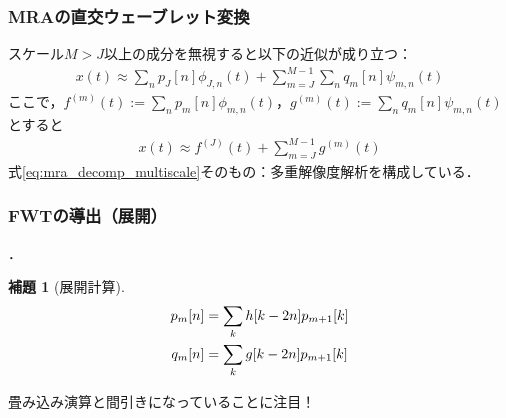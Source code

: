 \documentclass[dvipdfmx,graphicx,14pt]{beamer}
\newcommand{\roverline}[1]{\mathpalette\doroverline{#1}}
\newcommand{\doroverline}[2]{\overline{#1#2}}
\newtheorem{mylemma}{補題}
\begin{document}
\begin{frame}[c]
    \frametitle{MRAの直交ウェーブレット変換}
    スケール$M > J$以上の成分を無視すると以下の近似が成り立つ：
    \begin{align}
        x(t) \approx \sum_{n} p_{J}[n] \phi_{J,n}(t) + \sum_{m=J}^{M-1}\sum_{n} q_{m}[n] \psi_{m,n}(t) \label{eq:orth_approx}
    \end{align}
    ここで，$f^{(m)}(t) := \sum_{n} p_{m}[n] \phi_{m,n}(t)$，$g^{(m)}(t) := \sum_{n} q_{m}[n] \psi_{m,n}(t)$とすると
    \begin{align*}
        x(t) \approx f^{(J)}(t) + \sum_{m=J}^{M-1} g^{(m)}(t)
    \end{align*}
    式\eqref{eq:mra_decomp_multiscale}そのもの：多重解像度解析を構成している．
\end{frame}

\begin{frame}[c]
    \frametitle{FWTの導出（展開）}
    ．
    \begin{mylemma}[展開計算]
        \vspace*{-15pt}
        \begin{align}
            p_{m}[n] &= \sum_{k} \roverline{h[k - 2n]} p_{m+1}[k] \label{eq:scaling_coef_updation} \\
            q_{m}[n] &= \sum_{k} \roverline{g[k - 2n]} p_{m+1}[k] \label{eq:wavelet_coef_updation}
        \end{align}
    \end{mylemma}
    畳み込み演算と間引きになっていることに注目！
\end{frame}
\end{document}
